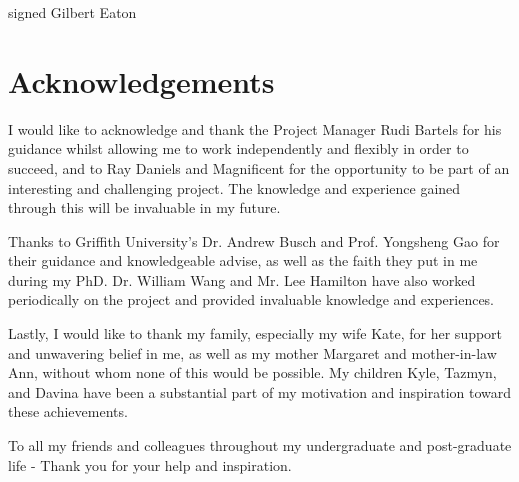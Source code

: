 \documentclass[fleqn,twoside,12pt]{report}
\begin{document}
\vspace{30pt}

signed
Gilbert Eaton



\vspace*{\fill}%



\newpage

\chapter*{Acknowledgements}


I would like to acknowledge and thank the Project Manager Rudi Bartels for his guidance whilst allowing me to work independently and flexibly in order to succeed, and to Ray Daniels and Magnificent for the opportunity to be part of an interesting and challenging project. The knowledge and experience gained through this will be invaluable in my future.

Thanks to Griffith University's Dr. Andrew Busch and Prof. Yongsheng Gao for their guidance and knowledgeable advise, as well as the faith they put in me during my PhD. Dr. William Wang and Mr. Lee Hamilton have also worked periodically on the project and provided invaluable knowledge and experiences.

Lastly, I would like to thank my family, especially my wife Kate, for her support and unwavering belief in me, as well as my mother Margaret and mother-in-law Ann, without whom none of this would be possible. My children Kyle, Tazmyn, and Davina have been a substantial part of my motivation and inspiration toward these achievements.

To all my friends and colleagues throughout my undergraduate and post-graduate life - Thank you for your help and inspiration.

\vspace*{\fill}%



\newpage
\end{document}
